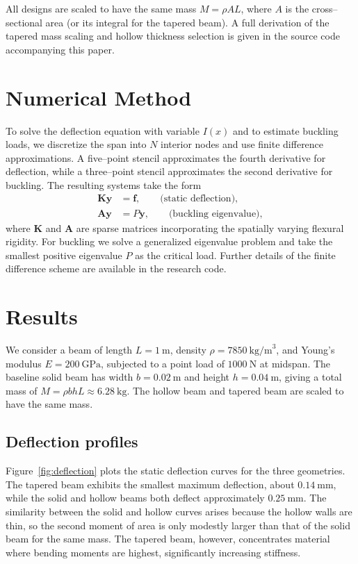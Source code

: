 \documentclass[11pt]{article}
\begin{document}
All designs are scaled to have the same mass $M=\rho A L$, where $A$ is the
cross--sectional area (or its integral for the tapered beam).  A full
derivation of the tapered mass scaling and hollow thickness selection is
given in the source code accompanying this paper.

\section{Numerical Method}
\label{sec:numerical}

To solve the deflection equation with variable $I(x)$ and to estimate
buckling loads, we discretize the span into $N$ interior nodes and use
finite difference approximations.  A five--point stencil approximates the
fourth derivative for deflection, while a three--point stencil
approximates the second derivative for buckling.  The resulting systems
take the form
\begin{align}
  \bm{K} \bm{y} &= \bm{f}, \qquad \text{(static deflection)},\\
  \bm{A} \bm{y} &= P \bm{y}, \qquad \text{(buckling eigenvalue)},
\end{align}
where $\bm{K}$ and $\bm{A}$ are sparse matrices incorporating the
spatially varying flexural rigidity.  For buckling we solve a generalized
eigenvalue problem and take the smallest positive eigenvalue $P$ as the
critical load.  Further details of the finite difference scheme are
available in the research code.

\section{Results}
\label{sec:results}

We consider a beam of length $L=1~\text{m}$, density $\rho=7850~\text{kg/m}^3$,
and Young's modulus $E=200~\text{GPa}$, subjected to a point load of
$1000~\text{N}$ at midspan.  The baseline solid beam has width
$b=0.02~\text{m}$ and height $h=0.04~\text{m}$, giving a total mass of
$M=\rho b h L \approx 6.28~\text{kg}$.  The hollow beam and tapered beam
are scaled to have the same mass.

\subsection{Deflection profiles}

Figure~\ref{fig:deflection} plots the static deflection curves for the three
geometries.  The tapered beam exhibits the smallest maximum deflection,
about $0.14~\text{mm}$, while the solid and hollow beams both deflect
approximately $0.25~\text{mm}$.  The similarity between the solid and hollow
curves arises because the hollow walls are thin, so the second moment of
area is only modestly larger than that of the solid beam for the same
mass.  The tapered beam, however, concentrates material where bending
moments are highest, significantly increasing stiffness.
\end{document}
